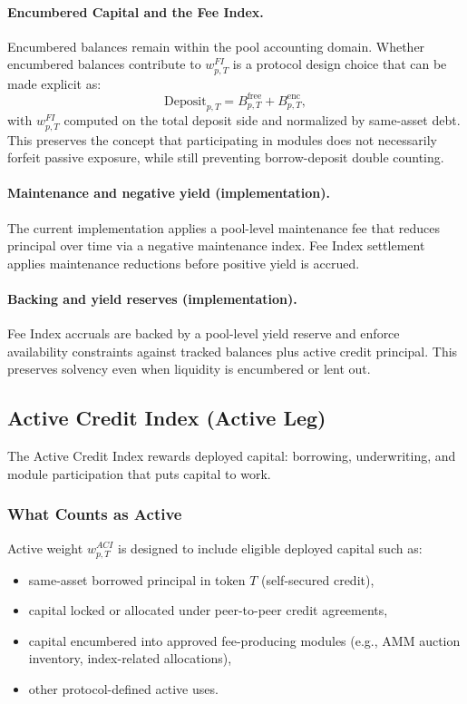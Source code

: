 \documentclass[version=preprint]{iacrcc}
\begin{document}
\paragraph{Encumbered Capital and the Fee Index.}
Encumbered balances remain within the pool accounting domain. Whether encumbered balances contribute to $w^{FI}_{p,T}$ is a protocol design choice that can be made explicit as:
\[
\text{Deposit}_{p,T} = B^{\text{free}}_{p,T} + B^{\text{enc}}_{p,T},
\]
with $w^{FI}_{p,T}$ computed on the total deposit side and normalized by same-asset debt. This preserves the concept that participating in modules does not necessarily forfeit passive exposure, while still preventing borrow-deposit double counting.

\paragraph{Maintenance and negative yield (implementation).}
The current implementation applies a pool-level maintenance fee that reduces principal over time via a negative maintenance index. Fee Index settlement applies maintenance reductions before positive yield is accrued.

\paragraph{Backing and yield reserves (implementation).}
Fee Index accruals are backed by a pool-level yield reserve and enforce availability constraints against tracked balances plus active credit principal. This preserves solvency even when liquidity is encumbered or lent out.

\subsection{Active Credit Index (Active Leg)}

The Active Credit Index rewards deployed capital: borrowing, underwriting, and module participation that puts capital to work.

\subsubsection{What Counts as Active}

Active weight $w^{ACI}_{p,T}$ is designed to include eligible deployed capital such as:
\begin{itemize}
  \item same-asset borrowed principal in token $T$ (self-secured credit),
  \item capital locked or allocated under peer-to-peer credit agreements,
  \item capital encumbered into approved fee-producing modules (e.g., AMM auction inventory, index-related allocations),
  \item other protocol-defined active uses.
\end{itemize}
\end{document}
